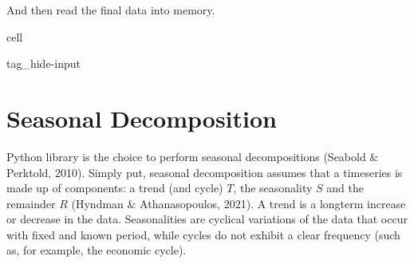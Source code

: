 \documentclass[letterpaper,10pt,english]{jupyterBook}
\begin{document}
\begin{sphinxVerbatim}[commandchars=\\\{\}]
       
          
      
  
               
    
   
\end{sphinxVerbatim}

\sphinxAtStartPar
And then read the final data into memory.

\begin{sphinxuseclass}{cell}
\begin{sphinxuseclass}{tag_hide-input}
\end{sphinxuseclass}
\end{sphinxuseclass}

\section{Seasonal Decomposition}
\label{\detokenize{05-time_series_analysis:seasonal-decomposition}}
\sphinxAtStartPar
Python library  is the choice to perform seasonal decompositions (Seabold \& Perktold, 2010). Simply put, seasonal decomposition assumes that a time\sphinxhyphen{}series is made up of components: a trend (and cycle) \(T\), the seasonality \(S\) and the remainder \(R\) (Hyndman \& Athanasopoulos, 2021). A trend is a long\sphinxhyphen{}term increase or decrease in the data. Seasonalities are cyclical variations of the data that occur with fixed and known period, while cycles do not exhibit a clear frequency (such as, for example, the economic cycle).
\end{document}
